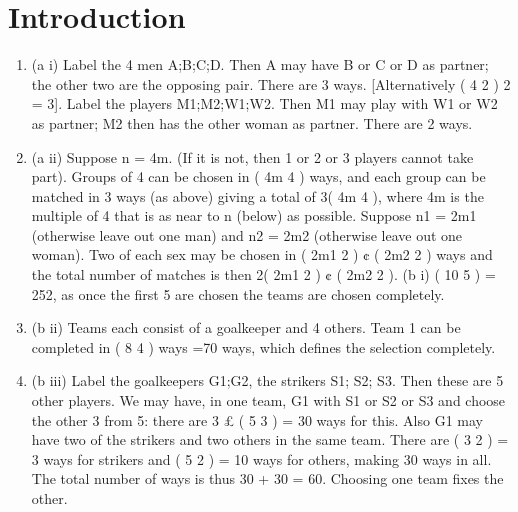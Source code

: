 \documentclass{article}
\begin{document}
\section{Introduction}
\begin{enumerate}
\item (a i) Label the 4 men A;B;C;D. Then A may have B or C or D as partner; the
other two are the opposing pair. There are 3 ways. [Alternatively
( 4
2 )
2
= 3].
Label the players M1;M2;W1;W2. Then M1 may play with W1 or W2 as
partner; M2 then has the other woman as partner. There are 2 ways.

\item (a ii) Suppose n = 4m. (If it is not, then 1 or 2 or 3 players cannot take part).
Groups of 4 can be chosen in ( 4m
4 ) ways, and each group can be matched
in 3 ways (as above) giving a total of 3( 4m
4 ), where 4m is the multiple of 4
that is as near to n (below) as possible.
Suppose n1 = 2m1 (otherwise leave out one man) and n2 = 2m2 (otherwise
leave out one woman).
Two of each sex may be chosen in ( 2m1
2 ) ¢ ( 2m2
2 ) ways and the total number
of matches is then 2( 2m1
2 ) ¢ ( 2m2
2 ).
(b i) ( 10
5 ) = 252, as once the first 5 are chosen the teams are chosen completely.

\item (b ii) Teams each consist of a goalkeeper and 4 others. Team 1 can be completed
in ( 8
4 ) ways =70 ways, which defines the selection completely.
\item (b iii) Label the goalkeepers G1;G2, the strikers S1; S2; S3. Then these are 5 other
players.
We may have, in one team, G1 with S1 or S2 or S3 and choose the other 3
from 5: there are 3 £ ( 5
3 ) = 30 ways for this. Also G1 may have two of
the strikers and two others in the same team. There are ( 3
2 ) = 3 ways for
strikers and ( 5
2 ) = 10 ways for others, making 30 ways in all. The total
number of ways is thus 30 + 30 = 60. Choosing one team fixes the other.
\end{enumerate}
\end{document}
